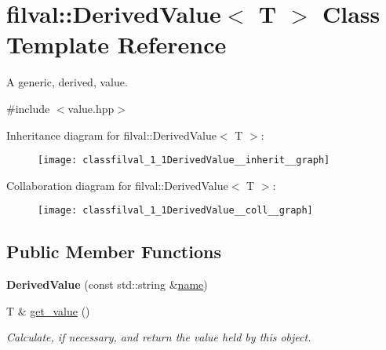\hypertarget{classfilval_1_1DerivedValue}{}\section{filval\+:\+:Derived\+Value$<$ T $>$ Class Template Reference}
\label{classfilval_1_1DerivedValue}


A generic, derived, value.  




{\ttfamily \#include $<$value.\+hpp$>$}



Inheritance diagram for filval\+:\+:Derived\+Value$<$ T $>$\+:
\nopagebreak
\begin{figure}[H]
\begin{center}
\leavevmode
\texttt{[image: classfilval\_1\_1DerivedValue\_\_inherit\_\_graph]}
\end{center}
\end{figure}


Collaboration diagram for filval\+:\+:Derived\+Value$<$ T $>$\+:
\nopagebreak
\begin{figure}[H]
\begin{center}
\leavevmode
\texttt{[image: classfilval\_1\_1DerivedValue\_\_coll\_\_graph]}
\end{center}
\end{figure}
\subsection*{Public Member Functions}
\begin{DoxyCompactItemize}
\item 
\hypertarget{classfilval_1_1DerivedValue_a9725de2e3291d27e51e70cc830e19836}{}\label{classfilval_1_1DerivedValue_a9725de2e3291d27e51e70cc830e19836} 
{\bfseries Derived\+Value} (const std\+::string \&\hyperlink{classfilval_1_1GenValue_a007e38c03ee041c2a657afa3d6e91ab1}{name})
\item 
\hypertarget{classfilval_1_1DerivedValue_a0c18a631ea057510200906e73198fa0c}{}\label{classfilval_1_1DerivedValue_a0c18a631ea057510200906e73198fa0c} 
T \& \hyperlink{classfilval_1_1DerivedValue_a0c18a631ea057510200906e73198fa0c}{get\+\_\+value} ()
\begin{DoxyCompactList}\small\item\em Calculate, if necessary, and return the value held by this object. \end{DoxyCompactList}\end{DoxyCompactItemize}
